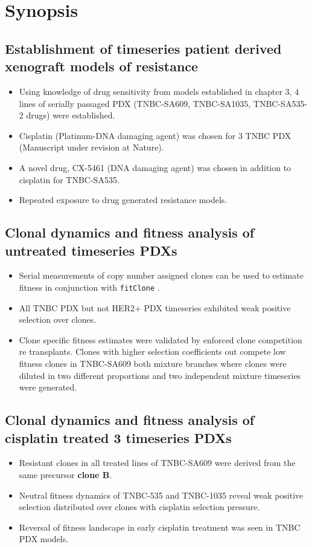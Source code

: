 \section{Synopsis}

\subsection {Establishment of timeseries patient derived xenograft models of resistance}
\begin{itemize}
\item	Using knowledge of drug sensitivity from models established in chapter 3, 4 lines of serially passaged PDX (TNBC-SA609, TNBC-SA1035, TNBC-SA535-2 drugs) were established.
\item	Cisplatin (Platinum-DNA damaging agent) was chosen for 3 TNBC PDX (Manuscript under revision at Nature).
\item	A novel drug, CX-5461 (DNA damaging agent) was chosen in addition to cisplatin for TNBC-SA535.
\item	Repeated exposure to drug generated resistance models.
\end{itemize}


\subsection {Clonal dynamics and fitness analysis of untreated timeseries PDXs}
\begin{itemize}

\item Serial measurements of copy number assigned clones can be used to estimate fitness in conjunction with \texttt{fitClone} \cite{salehi2020single}.

\item All TNBC PDX but not HER2+ PDX timeseries exhibited weak positive selection over clones.
\item Clone specific fitness estimates were validated by enforced clone competition re transplants. Clones with higher selection coefficients out compete low fitness clones in TNBC-SA609 both mixture branches where clones were diluted in two different proportions and two independent mixture timeseries were generated.
 
\end{itemize} 

\subsection {Clonal dynamics and fitness analysis of cisplatin treated 3 timeseries PDXs}
\begin{itemize}
 \item Resistant clones in all treated lines of TNBC-SA609 were derived from the same precursor \textbf{clone B}.
 \item Neutral fitness dynamics of TNBC-535 and TNBC-1035 reveal weak positive selection distributed over clones with cisplatin selection pressure.
 \item Reversal of fitness landscape in early cisplatin treatment was seen in TNBC PDX models.
 \end{itemize}
 
